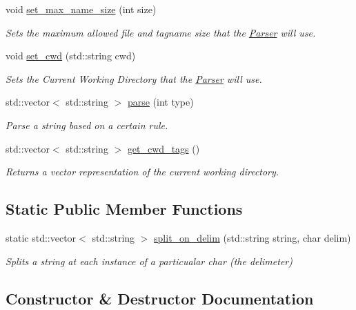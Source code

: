 \begin{DoxyCompactItemize}
void \mbox{\hyperlink{classParser_ac9c3bf43a7f27f92ecf538b83c5984d6}{set\+\_\+max\+\_\+name\+\_\+size}} (int size)
\begin{DoxyCompactList}\small\item\em Sets the maximum allowed file and tagname size that the \mbox{\hyperlink{classParser}{Parser}} will use. \end{DoxyCompactList}\item 
void \mbox{\hyperlink{classParser_a086f1431a0cac193fb6ff4506ba5c701}{set\+\_\+cwd}} (std\+::string cwd)
\begin{DoxyCompactList}\small\item\em Sets the Current Working Directory that the \mbox{\hyperlink{classParser}{Parser}} will use. \end{DoxyCompactList}\item 
std\+::vector$<$ std\+::string $>$ \mbox{\hyperlink{classParser_a5b531e9ed867eeb8ccb9cb088cf35c24}{parse}} (int type)
\begin{DoxyCompactList}\small\item\em Parse a string based on a certain rule. \end{DoxyCompactList}\item 
std\+::vector$<$ std\+::string $>$ \mbox{\hyperlink{classParser_aa973764b863dfbe448fa2fd7aa9ffdaa}{get\+\_\+cwd\+\_\+tags}} ()
\begin{DoxyCompactList}\small\item\em Returns a vector representation of the current working directory. \end{DoxyCompactList}\end{DoxyCompactItemize}
\subsection*{Static Public Member Functions}
\begin{DoxyCompactItemize}
\item 
static std\+::vector$<$ std\+::string $>$ \mbox{\hyperlink{classParser_a71c87961db9707dc18db00a645d3d1e5}{split\+\_\+on\+\_\+delim}} (std\+::string string, char delim)
\begin{DoxyCompactList}\small\item\em Splits a string at each instance of a particualar char (the delimeter) \end{DoxyCompactList}\end{DoxyCompactItemize}


\subsection{Constructor \& Destructor Documentation}
\mbox{\label{classParser_a306c6c33d7a6cf1bb682be360fcfe982}} 
